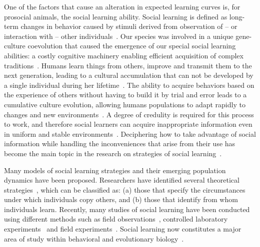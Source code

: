 \documentclass[a4paper,10pt]{book}
\theoremstyle{definition}
\begin{document}
One of the factors that cause an alteration in expected learning curves is, for prosocial animals, the social learning ability.
Social learning is defined as long-term changes in behavior caused by stimuli derived from observation 
of -- or interaction with -- other individuals~\cite{hoppitt2013-socialLearningAnIntroductionBook,bandura1977-socialLearning}.
Our species was involved in a unique gene-culture coevolution that caused the emergence of our special social learning abilities: a costly cognitive machinery enabling efficient acquisition of complex traditions~\cite{Richerson2010}.
Humans learn things from others, improve and transmit them to the next generation, leading to a cultural accumulation that can not be developed by a single individual during her lifetime~\cite{boyd1985-evolutionaryProcess}.
The ability to acquire behaviors based on the experience of others without having to build it by trial and error leads to a cumulative culture evolution, allowing humans populations to adapt rapidly to changes and new environments~\cite{Boyd2011}.
A degree of credulity is required for this process to work, and therefore social learners can acquire inappropriate information even in uniform and stable environments~\cite{feldman1996-individualVsSocialLearningEvolutionaryAnalysis,giraldeau2002-potentialDisadvantagesSocialLearning}.
Deciphering how to take advantage of social information while handling the inconveniences that arise from their use has become the main topic in the research on strategies of social learning~\cite{henrich2003-evolutionOfCulturalEvolution,rendell2011-cognitiveCulture}.

Many models of social learning strategies and their emerging population dynamics have been proposed.
Researchers have identified several theoretical strategies~\cite{rendell2011-cognitiveCulture,rendell2010-socialLearningTournament}, which can be classified as: 
(a) those that specify the circumstances under which individuals copy others, and 
(b) those that identify from whom individuals learn.
Recently, many studies of social learning have been conducted using different methods such as field observations~\cite{henrich2011-adaptativeLearningBiasesFiji}, controlled laboratory experiments~\cite{Baum2004,mcelreath2008-outsideLaboratorySocialLearningStrategies,efferson2008-empiricsOfFrequencyDependentCulturalTransmission,rendell2010-socialLearningTournament,mesoudi2011-experimentalPayoffBiasedSocialLearningUnderused,molleman2014-individualDifferencesSocialLearningStrategies,toelch2014-humanSocialInformationUse,caldwell2016-innovationLaboratoryCulturalEvolution,muthukrishna2016-whenAndWhoSocialLearning} and field experiments~\cite{henrich2001-eco15Soc,efferson2007-learningCulturalTransmissionBolivia,wisdom2013-experiment,Glowacki2017}.
Social learning now constitutes a major area of study within behavioral and evolutionary biology~\cite{mesoudi2016-individualAndCulturalVariationSocialLearning}.
\end{document}
